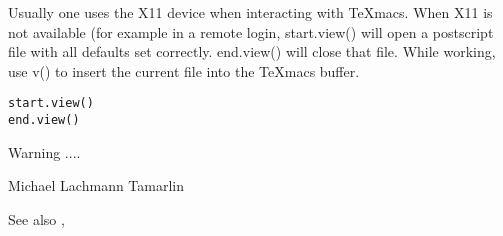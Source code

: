 \begin{Description}\relax
Usually one uses the X11 device when interacting with TeXmacs. When
X11 is not available (for example in a remote login, start.view() will
open a postscript file with all defaults set correctly. end.view()
will close that file. While working, use v() to insert the current
file into the TeXmacs buffer.\end{Description}
\begin{Usage}
\begin{verbatim}
start.view()
end.view()
\end{verbatim}
\end{Usage}
\begin{Details}\relax
\end{Details}
\begin{Section}{Warning}
....\end{Section}
\begin{Author}\relax
Michael Lachmann Tamarlin\end{Author}
\begin{SeeAlso}\relax
See also ,\end{SeeAlso}
\begin{Examples}
\end{Examples}

